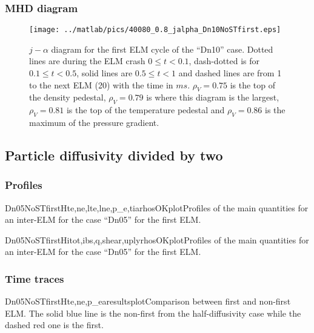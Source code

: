 \subsubsection{MHD diagram}\label{sec:app:graphs:recovery:first:Dn10:jalpha}
\begin{figure}[H]
\begin{center}
\texttt{[image: ../matlab/pics/40080\_0.8\_jalpha\_Dn10NoSTfirst.eps]}
\vspace{-0.5cm}
\end{center}
\caption{\footnotesize $j - \alpha$ diagram for the first ELM cycle of the ``Dn10'' case. Dotted lines are during the ELM crash $0 \le t <0.1$, dash-dotted is for $0.1 \le t < 0.5$, solid lines are $0.5 \le t < 1$ and dashed lines are from 1 to the next ELM (20) with the time in $ms$. $\rho_V = 0.75$ is the top of the density pedestal, $\rho_V = 0.79$ is where this diagram is the largest, $\rho_V = 0.81$ is the top of the temperature pedestal and $\rho_V = 0.86$ is the maximum of the pressure gradient.\label{fig:results:ELM:Dn10first:jalpha}}
\vspace{-0.5cm}
\end{figure}
\subsection{Particle diffusivity divided by two}\label{sec:app:graphs:recovery:first:Dn05}
\subsubsection{Profiles}\label{sec:app:graphs:recovery:first:Dn05:profiles}
\begin{AllFigs}{Dn05NoSTfirst}{H}{}{te,ne,lte,lne,p_e,ti}{a}{rhosOKplot}{Profiles of the main quantities for an inter-ELM for the case ``Dn05'' for the first ELM.}
\end{AllFigs}

\begin{AllFigs}{Dn05NoSTfirst}{H}{}{itot,ibs,q,shear,upl}{y}{rhosOKplot}{Profiles of the main quantities for an inter-ELM for the case ``Dn05'' for the first ELM.}
\end{AllFigs}
\subsubsection{Time traces}\label{sec:app:graphs:recovery:first:Dn05:traces}
\begin{AllFigs}{Dn05NoSTfirst}{H}{}{te,ne,p_e}{a}{resultsplot}{Comparison between first and non-first ELM. The solid blue line is the non-first from the half-diffusivity case while the dashed red one is the first.}
\end{AllFigs}

